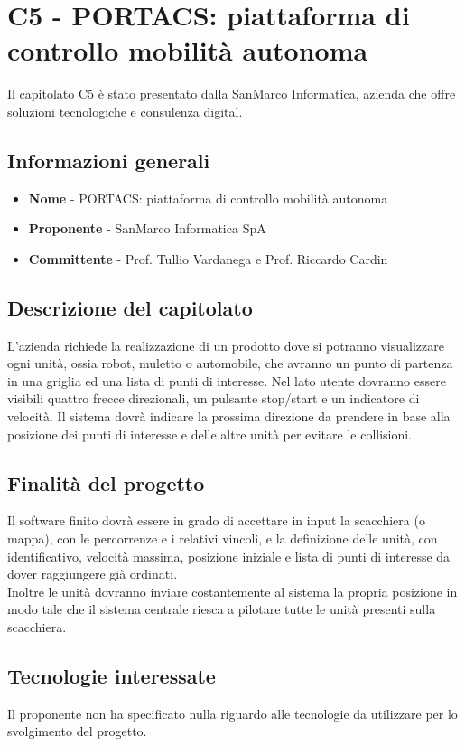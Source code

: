 \chapter{C5 - PORTACS: piattaforma di controllo mobilità autonoma}
Il capitolato C5 è stato presentato dalla SanMarco Informatica, azienda che offre soluzioni tecnologiche e consulenza digital.
\section{Informazioni generali}
\begin{itemize}
	\item \textbf{Nome} - PORTACS: piattaforma di controllo mobilità autonoma
	\item \textbf{Proponente} - SanMarco Informatica SpA
	\item \textbf{Committente} - Prof. Tullio Vardanega e Prof. Riccardo Cardin
\end{itemize}
\section{Descrizione del capitolato}
L'azienda richiede la realizzazione di un prodotto dove si potranno visualizzare ogni unità, ossia robot, muletto o automobile, che avranno un punto di partenza in una griglia ed una lista di punti di interesse. Nel lato utente dovranno essere visibili quattro frecce direzionali, un pulsante stop/start e un indicatore di velocità. Il sistema dovrà indicare la prossima direzione da prendere in base alla posizione dei punti di interesse e delle altre unità per evitare le collisioni.
\section{Finalità del progetto}
Il software finito dovrà essere in grado di accettare in input la scacchiera (o mappa), con le percorrenze e i relativi vincoli, e la definizione delle unità, con identificativo, velocità massima, posizione iniziale e lista di punti di interesse da dover raggiungere già ordinati. \\
Inoltre le unità dovranno inviare costantemente al sistema la propria posizione in modo tale che il sistema centrale riesca a pilotare tutte le unità presenti sulla scacchiera.
\section{Tecnologie interessate}
Il proponente non ha specificato nulla riguardo alle tecnologie da utilizzare per lo svolgimento del progetto.
